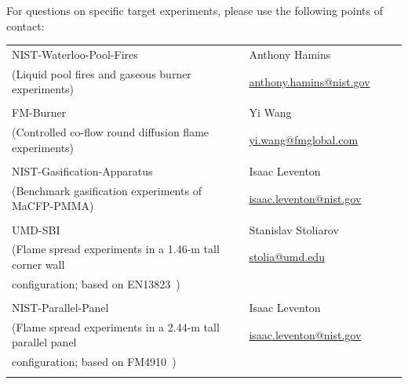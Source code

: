 \documentclass[12pt]{article}
\begin{document}
\noindent For questions on specific target experiments, please use the following points of contact:
\begin{table}[htb]
\begin{tabular}{|p{0.6\linewidth} | p{0.4\linewidth}|}
\hline
NIST-Waterloo-Pool-Fires           & Anthony Hamins\\
(Liquid pool fires and gaseous burner experiments)& \href{mailto:anthony.hamins@nist.gov}{anthony.hamins@nist.gov}\\
&\\
\hline
FM-Burner & Yi Wang\\
(Controlled co-flow round diffusion flame experiments)& \href{mailto:yi.wang@fmglobal.com}{yi.wang@fmglobal.com}\\
&\\
\hline
NIST-Gasification-Apparatus & Isaac Leventon \\
(Benchmark gasification experiments of MaCFP-PMMA)&\href{mailto:isaac.leventon@nist.gov}{isaac.leventon@nist.gov}\\
&\\
\hline
UMD-SBI & Stanislav Stoliarov \\
(Flame spread experiments in a 1.46-m tall corner wall &\href{mailto:stolia@umd.edu}{stolia@umd.edu}\\
configuration; based on EN13823~\cite{EN-13823standard})&\\
&\\
\hline
NIST-Parallel-Panel &Isaac Leventon \\
(Flame spread experiments in a 2.44-m tall parallel panel&\href{mailto:isaac.leventon@nist.gov}{isaac.leventon@nist.gov}\\
configuration; based on FM4910~\cite{FM-4910standard})& \\
& \\
\hline

\end{tabular}
\end{table}

\clearpage

\end{document}
